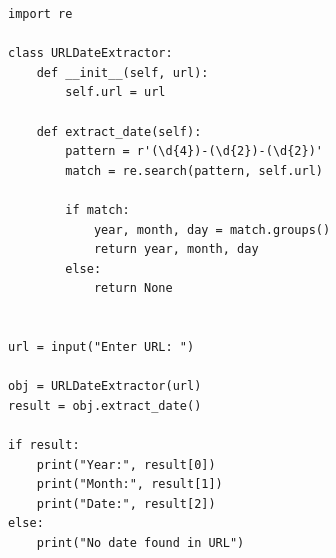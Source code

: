 \begin{verbatim}
import re

class URLDateExtractor:
    def __init__(self, url):
        self.url = url

    def extract_date(self):
        pattern = r'(\d{4})-(\d{2})-(\d{2})'
        match = re.search(pattern, self.url)

        if match:
            year, month, day = match.groups()
            return year, month, day
        else:
            return None


url = input("Enter URL: ")

obj = URLDateExtractor(url)
result = obj.extract_date()

if result:
    print("Year:", result[0])
    print("Month:", result[1])
    print("Date:", result[2])
else:
    print("No date found in URL")
\end{verbatim}